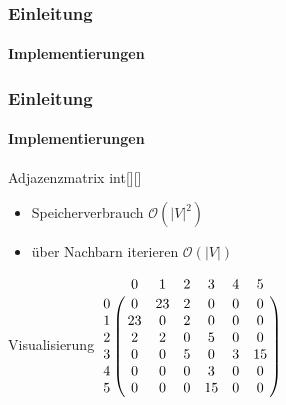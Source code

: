 \begin{frame}
    \frametitle{Einleitung}
    \framesubtitle{Implementierungen}
\end{frame}

\begin{frame}
    \frametitle{Einleitung}
    \framesubtitle{Implementierungen}
    \begin{KITexampleblock}{Adjazenzmatrix}
    int[][]
    \begin{itemize}
        \item Speicherverbrauch \( \mathcal{O}(|V|^2)\)
        \item über Nachbarn iterieren \( \mathcal{O}(|V|)\)
    \end{itemize}
    \end{KITexampleblock}
    \vspace{0.001em}
    \begin{KITinfoblock}{Visualisierung}
        $\bordermatrix{
  & 0  & 1  & 2  & 3  & 4  & 5  \cr
0 & 0  & 23 & 2  & 0  & 0  & 0  \cr
1 & 23 & 0  & 2  & 0  & 0  & 0  \cr
2 & 2  & 2  & 0  & 5  & 0  & 0  \cr
3 & 0  & 0  & 5  & 0  & 3  & 15 \cr
4 & 0  & 0  & 0  & 3  & 0  & 0  \cr
5 & 0  & 0  & 0  & 15 & 0  & 0  \cr
}$
    \end{KITinfoblock}
\end{frame}

